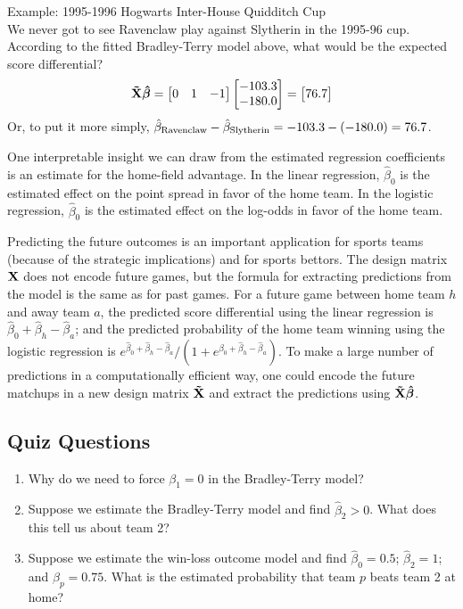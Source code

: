 \documentclass{article}
\begin{document}
  \begin{framed}
    {\sc Example:} 1995-1996 Hogwarts Inter-House Quidditch Cup\\
    We never got to see Ravenclaw play against Slytherin in the 1995-96 cup. According to the fitted Bradley-Terry model above, what would be the expected score differential?
    $$
      {\bf\tilde X}\boldsymbol{\hat\beta} =
      \begin{bmatrix*}[r] 0 &  1 & -1\end{bmatrix*}
      \begin{bmatrix*}[r] -103.3 \\ -180.0 \end{bmatrix*} =
      \begin{bmatrix*}[r] 76.7 \end{bmatrix*}
    $$
    Or, to put it more simply, $\hat\beta_{\mbox{\scriptsize Ravenclaw}} - \hat\beta_{\mbox{\scriptsize Slytherin}} = -103.3 - (-180.0) = 76.7$.
  \end{framed}

  One interpretable insight we can draw from the estimated regression coefficients is an estimate for the home-field advantage. In the linear regression, $\hat\beta_0$ is the estimated effect on the point spread in favor of the home team. In the logistic regression, $\hat\beta_0$ is the estimated effect on the log-odds in favor of the home team.

  Predicting the future outcomes is an important application for sports teams (because of the strategic implications) and for sports bettors. The design matrix $\bf X$ does not encode future games, but the formula for extracting predictions from the model is the same as for past games. For a future game between home team $h$ and away team $a$, the predicted score differential using the linear regression is $\hat\beta_0 + \hat\beta_h - \hat\beta_a$; and the predicted probability of the home team winning using the logistic regression is $e^{\hat\beta_0 + \hat\beta_h - \hat\beta_a} / (1 + e^{\hat\beta_0 + \hat\beta_h - \hat\beta_a})$. To make a large number of predictions in a computationally efficient way, one could encode the future matchups in a new design matrix $\bf \tilde X$ and extract the predictions using $\bf \tilde X \boldsymbol{\hat\beta}$.

  \subsection{\sc Quiz Questions}

  \begin{enumerate}
    \item Why do we need to force $\beta_1 = 0$ in the Bradley-Terry model?
    \item Suppose we estimate the Bradley-Terry model and find $\hat\beta_2 > 0$. What does this tell us about team 2?
    \item Suppose we estimate the win-loss outcome model and find $\hat\beta_0 = 0.5$; $\hat\beta_2 = 1$; and $\hat\beta_p = 0.75$. What is the estimated probability that team $p$ beats team 2 at home?
  \end{enumerate}
\end{document}
